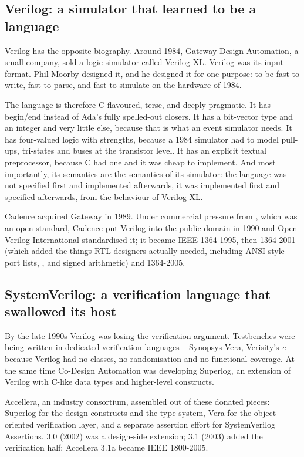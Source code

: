 \subsection{Verilog: a simulator that learned to be a language}

Verilog has the opposite biography. Around 1984, Gateway
Design Automation, a small company, sold a logic simulator called Verilog-XL.
Verilog was its input format. Phil Moorby designed it, and he designed it for
one purpose: to be fast to write, fast to parse, and fast to simulate on the
hardware of 1984.

The language is therefore C-flavoured, terse, and deeply pragmatic. It has
begin/end instead of Ada's fully spelled-out closers. It has a bit-vector type
and an integer and very little else, because that is what an event simulator
needs. It has four-valued logic with strengths, because a 1984 simulator had to
model pull-ups, tri-states and buses at the transistor level. It has an
explicit textual preprocessor, because C had one and it was cheap to implement.
And most importantly, its semantics are the semantics of its simulator: the
language was not specified first and implemented afterwards, it was implemented
first and specified afterwards, from the behaviour of Verilog-XL.

Cadence acquired Gateway in 1989. Under commercial pressure from \VHDL{}, which
was an open standard, Cadence put Verilog into the public domain in 1990 and
Open Verilog International standardised it; it became IEEE 1364-1995, then
1364-2001 (which added the things RTL designers actually needed, including
ANSI-style port lists, , and signed arithmetic) and 1364-2005.

\subsection{SystemVerilog: a verification language that swallowed its host}

By the late 1990s Verilog was losing the
verification argument. Testbenches were being written in dedicated verification
languages -- Synopsys Vera, Verisity's \textit{e} -- because Verilog had no
classes, no randomisation and no functional coverage. At the same time Co-Design
Automation was developing Superlog, an extension of Verilog with C-like data
types and higher-level constructs.

Accellera, an industry consortium, assembled \SV{} out of these donated pieces:
Superlog for the design constructs and the type system, Vera for the
object-oriented verification layer, and a separate assertion effort for
SystemVerilog Assertions. \SV{} 3.0 (2002) was a design-side extension; \SV{}
3.1 (2003) added the verification half; Accellera \SV{} 3.1a became IEEE
1800-2005.

